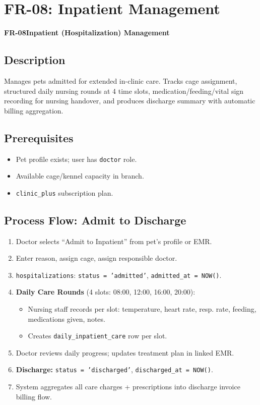 \documentclass[12pt,a4paper]{report}
\newcommand{\moduleheader}[2]{%
  \par\vspace{6pt}%
  \noindent\colorbox{branddark}{\color{white}\textbf{\small #1}}\quad\textbf{\large #2}%
  \par\vspace{4pt}%
}
\begin{document}
\chapter{FR-08: Inpatient Management}

\moduleheader{FR-08}{Inpatient (Hospitalization) Management}

\section{Description}

Manages pets admitted for extended in-clinic care. Tracks cage assignment, structured daily nursing rounds at 4 time slots, medication/feeding/vital sign recording for nursing handover, and produces discharge summary with automatic billing aggregation.

\section{Prerequisites}

\begin{itemize}
  \item Pet profile exists; user has \texttt{doctor} role.
  \item Available cage/kennel capacity in branch.
  \item \texttt{clinic\_plus} subscription plan.
\end{itemize}

\section{Process Flow: Admit to Discharge}

\begin{enumerate}
  \item Doctor selects ``Admit to Inpatient'' from pet's profile or EMR.
  \item Enter reason, assign cage, assign responsible doctor.
  \item \texttt{hospitalizations}: \texttt{status = 'admitted'}, \texttt{admitted\_at = NOW()}.
  \item \textbf{Daily Care Rounds} (4 slots: 08:00, 12:00, 16:00, 20:00):
    \begin{itemize}
      \item Nursing staff records per slot: temperature, heart rate, resp. rate, feeding, medications given, notes.
      \item Creates \texttt{daily\_inpatient\_care} row per slot.
    \end{itemize}
  \item Doctor reviews daily progress; updates treatment plan in linked EMR.
  \item \textbf{Discharge:} \texttt{status = 'discharged'}, \texttt{discharged\_at = NOW()}.
  \item System aggregates all care charges + prescriptions into discharge invoice \textrightarrow{} billing flow.
\end{enumerate}
\end{document}

